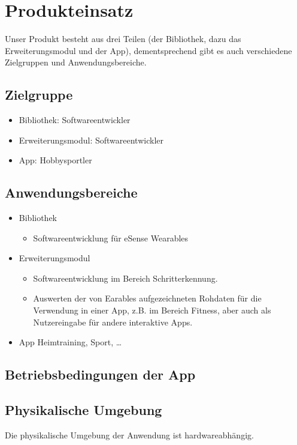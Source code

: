 \documentclass[a4paper,12pt]{article}
\begin{document}
\section{Produkteinsatz}
Unser Produkt besteht aus drei Teilen (der Bibliothek, dazu das Erweiterungsmodul und der App), dementsprechend gibt es auch verschiedene Zielgruppen und Anwendungsbereiche.
  \subsection{Zielgruppe}
  \begin{itemize}
    \item\textsf{Bibliothek:} Softwareentwickler
    \item\textsf{Erweiterungsmodul:} Softwareentwickler
    \item\textsf{App:} Hobbysportler
  \end{itemize}
  \subsection{Anwendungsbereiche}
    \begin{itemize}
      \item\textsf{Bibliothek} 
      \begin{itemize}
        \item Softwareentwicklung für eSense Wearables 
      \end{itemize}
      \item\textsf{Erweiterungsmodul}
      \begin{itemize}
        \item Softwareentwicklung im Bereich Schritterkennung.
        \item Auswerten der von \Gls{Earables} aufgezeichneten Rohdaten für die Verwendung in einer App, z.B. im Bereich Fitness, aber auch als Nutzereingabe für andere interaktive Apps.
      \end{itemize}
      \item\textsf{App} Heimtraining, Sport, \dots
    \end{itemize}
  \subsection{Betriebsbedingungen der App} %
    \subsection{Physikalische Umgebung}
      Die physikalische Umgebung der Anwendung ist hardwareabhängig.
\end{document}
